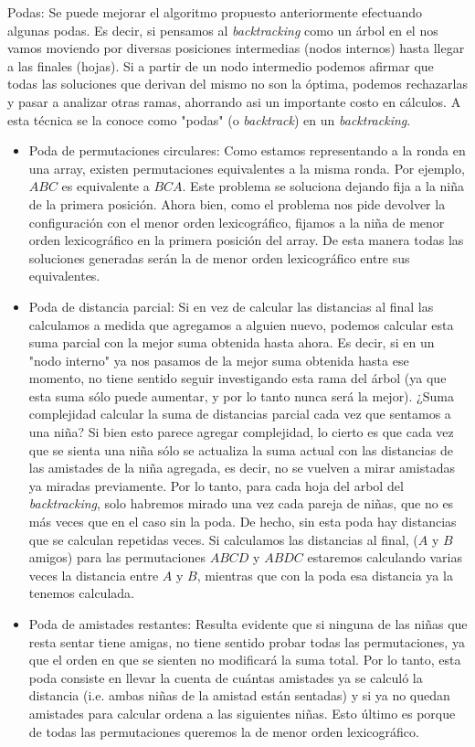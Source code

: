 Podas:
Se puede mejorar el algoritmo propuesto anteriormente efectuando algunas podas. Es decir, si pensamos al \textit{backtracking} como un \'arbol en el nos vamos moviendo por diversas posiciones intermedias (nodos internos) hasta llegar a las finales (hojas). Si a partir de un nodo intermedio podemos afirmar que todas las soluciones que derivan del mismo no son la \'optima, podemos rechazarlas y pasar a analizar otras ramas, ahorrando asi un importante costo en c\'alculos. A esta t\'ecnica se la conoce como "podas" (o \textit{backtrack}) en un \textit{backtracking}.

\begin{itemize}
\item Poda de permutaciones circulares: Como estamos representando a la ronda en una array, existen permutaciones equivalentes a la misma ronda. Por ejemplo, $ABC$ es equivalente a $BCA$. Este problema se soluciona dejando fija a la niña de la primera posici\'on. Ahora bien, como el problema nos pide devolver la configuraci\'on con el menor orden lexicogr\'afico, fijamos a la niña de menor orden lexicogr\'afico en la primera posici\'on del array. De esta manera todas las soluciones generadas ser\'an la de menor orden lexicogr\'afico entre sus equivalentes.

\item Poda de distancia parcial: Si en vez de calcular las distancias al final las calculamos a medida que agregamos a alguien nuevo, podemos calcular esta suma parcial con la mejor suma obtenida hasta ahora. Es decir, si en un "nodo interno" ya nos pasamos de la mejor suma obtenida hasta ese momento, no tiene sentido seguir investigando esta rama del \'arbol (ya que esta suma s\'olo puede aumentar, y por lo tanto nunca ser\'a la mejor). 
¿Suma complejidad calcular la suma de distancias parcial cada vez que sentamos a una niña? Si bien esto parece agregar complejidad, lo cierto es que cada vez que se sienta una niña s\'olo se actualiza la suma actual con las distancias de las amistades de la niña agregada, es decir, no se vuelven a mirar amistadas ya miradas previamente. Por lo tanto, para cada hoja del arbol del \textit{backtracking}, solo habremos mirado una vez cada pareja de niñas, que no es m\'as veces que en el caso sin la poda.
De hecho, sin esta poda hay distancias que se calculan repetidas veces. Si calculamos las distancias al final, ($A$ y $B$ amigos) para las permutaciones $ABCD$ y $ABDC$ estaremos calculando varias veces la distancia entre $A$ y $B$, mientras que con la poda esa distancia ya la tenemos calculada.

\item Poda de amistades restantes: Resulta evidente que si ninguna de las niñas que resta sentar tiene amigas, no tiene sentido probar todas las permutaciones, ya que el orden en que se sienten no modificar\'a la suma total. Por lo tanto, esta poda consiste en llevar la cuenta de cu\'antas amistades ya se calcul\'o la distancia (i.e. ambas niñas de la amistad est\'an sentadas) y si ya no quedan amistades para calcular ordena a las siguientes niñas. Esto \'ultimo es porque de todas las permutaciones queremos la de menor orden lexicogr\'afico.
\end{itemize}

